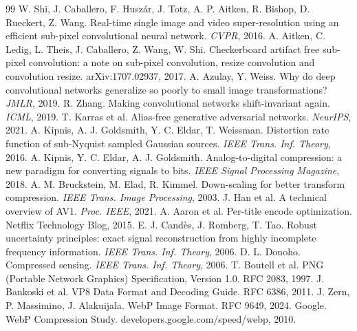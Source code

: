 \begin{thebibliography}{99}
   W. Shi, J. Caballero, F. Huszár, J. Totz, A. P. Aitken, R. Bishop, D. Rueckert, Z. Wang. Real-time single image and video super-resolution using an efficient sub-pixel convolutional neural network. \emph{CVPR}, 2016.
   A. Aitken, C. Ledig, L. Theis, J. Caballero, Z. Wang, W. Shi. Checkerboard artifact free sub-pixel convolution: a note on sub-pixel convolution, resize convolution and convolution resize. arXiv:1707.02937, 2017.
   A. Azulay, Y. Weiss. Why do deep convolutional networks generalize so poorly to small image transformations? \emph{JMLR}, 2019.
   R. Zhang. Making convolutional networks shift-invariant again. \emph{ICML}, 2019.
   T. Karras et al. Alias-free generative adversarial networks. \emph{NeurIPS}, 2021.
   A. Kipnis, A. J. Goldsmith, Y. C. Eldar, T. Weissman. Distortion rate function of sub-Nyquist sampled Gaussian sources. \emph{IEEE Trans. Inf. Theory}, 2016.
   A. Kipnis, Y. C. Eldar, A. J. Goldsmith. Analog-to-digital compression: a new paradigm for converting signals to bits. \emph{IEEE Signal Processing Magazine}, 2018.
   A. M. Bruckstein, M. Elad, R. Kimmel. Down-scaling for better transform compression. \emph{IEEE Trans. Image Processing}, 2003.
   J. Han et al. A technical overview of AV1. \emph{Proc. IEEE}, 2021.
   A. Aaron et al. Per-title encode optimization. Netflix Technology Blog, 2015.
   E. J. Candès, J. Romberg, T. Tao. Robust uncertainty principles: exact signal reconstruction from highly incomplete frequency information. \emph{IEEE Trans. Inf. Theory}, 2006.
   D. L. Donoho. Compressed sensing. \emph{IEEE Trans. Inf. Theory}, 2006.
   T. Boutell et al. PNG (Portable Network Graphics) Specification, Version 1.0. RFC 2083, 1997.
   J. Bankoski et al. VP8 Data Format and Decoding Guide. RFC 6386, 2011.
   J. Zern, P. Massimino, J. Alakuijala. WebP Image Format. RFC 9649, 2024.
   Google. WebP Compression Study. developers.google.com/speed/webp, 2010.
\end{thebibliography}

